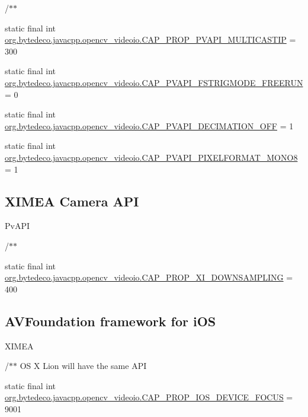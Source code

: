 /$\ast$$\ast$ \begin{DoxyCompactItemize}
\item 
static final int \hyperlink{group__videoio__flags__others_gae525c9cc0da137af131406ca12fd92d7}{org.\+bytedeco.\+javacpp.\+opencv\+\_\+videoio.\+C\+A\+P\+\_\+\+P\+R\+O\+P\+\_\+\+P\+V\+A\+P\+I\+\_\+\+M\+U\+L\+T\+I\+C\+A\+S\+T\+IP} = 300
\item 
static final int \hyperlink{group__videoio__flags__others_ga013dd4a15cafb63c7a4934abce8aaeb7}{org.\+bytedeco.\+javacpp.\+opencv\+\_\+videoio.\+C\+A\+P\+\_\+\+P\+V\+A\+P\+I\+\_\+\+F\+S\+T\+R\+I\+G\+M\+O\+D\+E\+\_\+\+F\+R\+E\+E\+R\+UN} = 0
\item 
static final int \hyperlink{group__videoio__flags__others_gadc78e206f0eea9da651ff0c67a8d4f4c}{org.\+bytedeco.\+javacpp.\+opencv\+\_\+videoio.\+C\+A\+P\+\_\+\+P\+V\+A\+P\+I\+\_\+\+D\+E\+C\+I\+M\+A\+T\+I\+O\+N\+\_\+\+O\+FF} = 1
\item 
static final int \hyperlink{group__videoio__flags__others_ga1dfffd05aca0c220f753ce014bdeea0f}{org.\+bytedeco.\+javacpp.\+opencv\+\_\+videoio.\+C\+A\+P\+\_\+\+P\+V\+A\+P\+I\+\_\+\+P\+I\+X\+E\+L\+F\+O\+R\+M\+A\+T\+\_\+\+M\+O\+N\+O8} = 1
\end{DoxyCompactItemize}
\subsection*{X\+I\+M\+EA Camera A\+PI}
\label{_amgrp27700f107007c227ac22f266c008393b}%
 Pv\+A\+PI 

/$\ast$$\ast$ \begin{DoxyCompactItemize}
\item 
static final int \hyperlink{group__videoio__flags__others_ga8cffe0305b23ba68e84c3948d29ed9d7}{org.\+bytedeco.\+javacpp.\+opencv\+\_\+videoio.\+C\+A\+P\+\_\+\+P\+R\+O\+P\+\_\+\+X\+I\+\_\+\+D\+O\+W\+N\+S\+A\+M\+P\+L\+I\+NG} = 400
\end{DoxyCompactItemize}
\subsection*{A\+V\+Foundation framework for i\+OS}
\label{_amgrpa29adce7291c258c56920a735b90577a}%
 X\+I\+M\+EA 

/$\ast$$\ast$ OS X Lion will have the same A\+PI \begin{DoxyCompactItemize}
\item 
static final int \hyperlink{group__videoio__flags__others_gaf0a40895d86f9a304aefc2b1293ada0b}{org.\+bytedeco.\+javacpp.\+opencv\+\_\+videoio.\+C\+A\+P\+\_\+\+P\+R\+O\+P\+\_\+\+I\+O\+S\+\_\+\+D\+E\+V\+I\+C\+E\+\_\+\+F\+O\+C\+US} = 9001
\end{DoxyCompactItemize}
